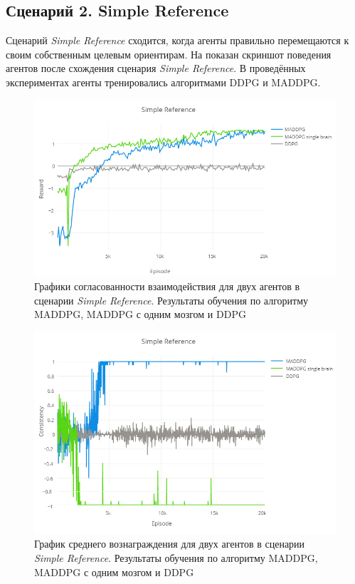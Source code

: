\subsection{Сценарий 2. Simple Reference}

Сценарий \textit{Simple Reference} сходится, когда агенты правильно перемещаются к своим собственным целевым ориентирам. На  показан скриншот поведения агентов после схождения сценария \textit{Simple Reference}. В проведённых экспериментах агенты тренировались алгоритмами DDPG и MADDPG.

\begin{figure}[ht!]
    \center
    \includegraphics [scale=0.6] {my_folder/images/ch5/sr-rew.png}
    \caption{Графики согласованности взаимодействия для двух агентов в сценарии \textit{Simple Reference}. Результаты обучения по алгоритму MADDPG, MADDPG с одним мозгом и DDPG}
    \label{fig:result-sr-rew}
\end{figure}

\begin{figure}[ht!]
    \center
    \includegraphics [scale=0.6] {my_folder/images/ch5/sr-comm.png}
    \caption{График среднего вознаграждения для двух агентов в сценарии \textit{Simple Reference}. Результаты обучения по алгоритму MADDPG, MADDPG с одним мозгом и DDPG}
    \label{fig:result-sr-comm}
\end{figure}

